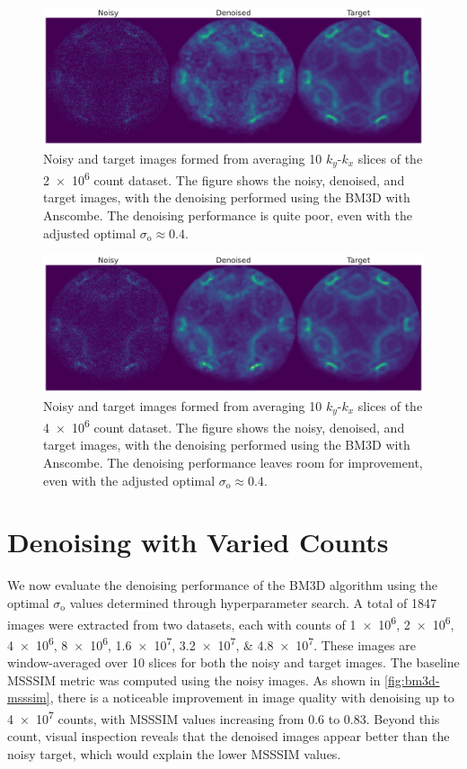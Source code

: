 \begin{figure}[h]
    \centering
    \includegraphics[width=1\linewidth]{images/noisy_denoised_ref_2M_avg_bm3d.pdf}
    \caption{Noisy and target images formed from averaging 10 $k_y$-$k_x$ slices of the \num{2e6} count dataset. The figure shows the noisy, denoised, and target images, with the denoising performed using the \gls{BM3D} with Anscombe. The denoising performance is quite poor, even with the adjusted optimal $\sigma_{\text{o}}\approx0.4$.}
    \label{fig:noisy-denoised-ref-2M-avg-bm3d}
\end{figure}


\begin{figure}[h]
    \centering
    \includegraphics[width=1\linewidth]{images/noisy_denoised_ref_4M_avg_bm3d.pdf}
    \caption{Noisy and target images formed from averaging 10 $k_y$-$k_x$ slices of the \num{4e6} count dataset. The figure shows the noisy, denoised, and target images, with the denoising performed using the \gls{BM3D} with Anscombe. The denoising performance leaves room for improvement, even with the adjusted optimal $\sigma_{\text{o}}\approx0.4$.}
    \label{fig:noisy-denoised-ref-4M-avg-bm3d}
\end{figure}

\section{Denoising with Varied Counts}
We now evaluate the denoising performance of the \gls{BM3D} algorithm using the optimal $\sigma_{\text{o}}$ values determined through hyperparameter search. A total of \num{1847} images were extracted from two datasets, each with counts of \numlist{1e6;2e6;4e6;8e6;1.6e7;3.2e7;4.8e7}. These images are window-averaged over 10 slices for both the noisy and target images. The baseline \gls{MSSSIM} metric was computed using the noisy images. As shown in \cref{fig:bm3d-msssim}, there is a noticeable improvement in image quality with denoising up to \num{4e7} counts, with \gls{MSSSIM} values increasing from \num{0.6} to \num{0.83}. Beyond this count, visual inspection reveals that the denoised images appear better than the noisy target, which would explain the lower \gls{MSSSIM} values.

